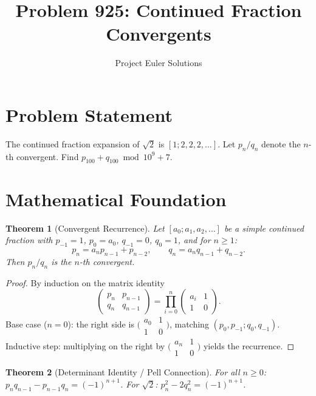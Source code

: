\documentclass[11pt]{article}
\title{Problem 925: Continued Fraction Convergents}
\author{Project Euler Solutions}
\date{}
\newtheorem{theorem}{Theorem}
\theoremstyle{definition}
\begin{document}
\maketitle

\section{Problem Statement}

The continued fraction expansion of $\sqrt{2}$ is $[1; 2, 2, 2, \ldots]$. Let $p_n/q_n$ denote the $n$-th convergent. Find $p_{100} + q_{100} \bmod 10^9+7$.

\section{Mathematical Foundation}

\begin{theorem}[Convergent Recurrence]
Let $[a_0; a_1, a_2, \ldots]$ be a simple continued fraction with $p_{-1}=1$, $p_0=a_0$, $q_{-1}=0$, $q_0=1$, and for $n \geq 1$:
\[
p_n = a_n p_{n-1} + p_{n-2}, \qquad q_n = a_n q_{n-1} + q_{n-2}.
\]
Then $p_n/q_n$ is the $n$-th convergent.
\end{theorem}

\begin{proof}
By induction on the matrix identity
\[
\begin{pmatrix} p_n & p_{n-1} \\ q_n & q_{n-1} \end{pmatrix} = \prod_{i=0}^{n} \begin{pmatrix} a_i & 1 \\ 1 & 0 \end{pmatrix}. \tag{M}
\]
Base case ($n=0$): the right side is $\bigl(\begin{smallmatrix} a_0 & 1 \\ 1 & 0 \end{smallmatrix}\bigr)$, matching $(p_0,p_{-1};q_0,q_{-1})$. Inductive step: multiplying on the right by $\bigl(\begin{smallmatrix} a_n & 1 \\ 1 & 0 \end{smallmatrix}\bigr)$ yields the recurrence.
\end{proof}

\begin{theorem}[Determinant Identity / Pell Connection]
For all $n \geq 0$: $p_n q_{n-1} - p_{n-1}q_n = (-1)^{n+1}$. For $\sqrt{2}$: $p_n^2 - 2q_n^2 = (-1)^{n+1}$.
\end{theorem}
\end{document}
